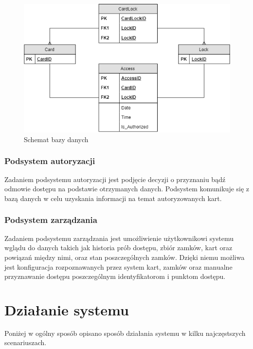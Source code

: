                                 \begin{figure}
                                        \includegraphics[width=\linewidth]{chapters/images/schema.png}
                                        \caption{Schemat bazy danych}
                                        \label{fig:schema}
                                \end{figure}

                        \subsubsection{Podsystem autoryzacji}
                                Zadaniem podsystemu autoryzacji jest podjęcie decyzji o przyznaniu bądź odmowie dostępu na podstawie otrzymanych danych. Podsystem komunikuje się z bazą danych w celu uzyskania informacji na temat autoryzowanych kart.

                        \subsubsection{Podsystem zarządzania}
                                Zadaniem podsystemu zarządzania jest umożliwienie użytkownikowi systemu wglądu do danych takich jak historia prób dostępu, zbiór zamków, kart oraz powiązań między nimi, oraz stan poszczególnych zamków. Dzięki niemu możliwa jest konfiguracja rozpoznawanych przez system kart, zamków oraz manualne przyznawanie dostępu poszczególnym identyfikatorom i punktom dostępu.

        \section{Działanie systemu}
                Poniżej w ogólny sposób opisano sposób działania systemu w kilku najczęstszych scenariuszach.

